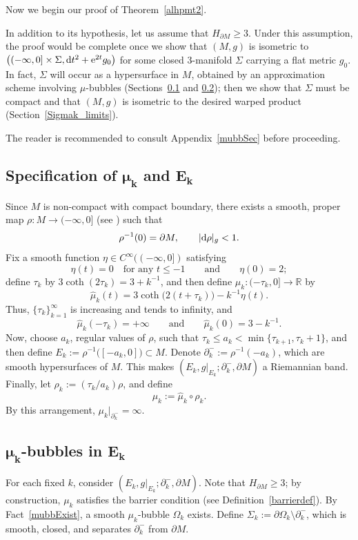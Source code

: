 \documentclass[10pt,a4paper]{amsart}
\numberwithin{equation}{section}
\def\ed{{\rm d}}
\begin{document}
Now we begin our proof of Theorem~\ref{alhpmt2}.

In addition to its hypothesis, let us assume that $H_{\partial M} \ge 3$.
Under this assumption, the proof would be complete once we show that
$(M,g)$ is isometric to $\bigl((-\infty,0]\times \Sigma, \ed t^2 + {\rm e}^{2t} g_0\bigr)$ for some
closed $3$-manifold $\Sigma$ carrying a flat metric $g_0$. In fact,
 $\Sigma$ will occur as a hypersurface in $M$, obtained by an approximation scheme involving $\mu$-bubbles (Sections~\ref{tauketc} and \ref{muk_in_Ek}); then we show that $\Sigma$ must be compact and that $(M,g)$ is isometric to the desired warped product (Section~\ref{Sigmak_limits}).

The reader is recommended to consult Appendix~\ref{mubbSec} before proceeding.

\subsection[Specification of mu\_{}k and E\_{}k]{Specification of $\boldsymbol{\mu_k}$ and $\boldsymbol{E_k}$}\label{tauketc}

Since $M$ is non-compact with compact boundary, there exists a smooth, proper map $\rho\colon M\rightarrow (-\infty,0]$ (see \cite[Lemma 2.1]{Zhu2020}) such that
\[
	\rho^{-1}(0)=\partial M,\qquad |\ed\rho|_g<1.
\]
Fix a smooth function $\eta\in C^\infty((-\infty,0])$ satisfying
\[
	\eta(t)=0 \quad\mbox{for any } t\le -1 \qquad \mbox{and}\qquad \eta (0)=2;
\]
define $\tau_k$ by
$ 3\coth(2\tau_k) = 3+ k^{-1}$,
and then define $\hat\mu_{k}\colon (-\tau_k,0]\rightarrow \mathbb{R}$ by
\[
	\hat\mu_{k}(t)=3\coth\bigl(2(t+\tau_k)\bigr)-k^{-1}\eta(t).
\]
Thus, $\{\tau_k\}_{k = 1}^\infty$ is increasing and tends to infinity, and
\[
	\hat\mu_{k}(-\tau_k)=+\infty\qquad\mbox{and}\qquad \hat\mu_{k}(0)=3-k^{-1}.
\]
Now, choose $a_k$, regular values of
$\rho$, such that $\tau_k\le a_k < \min\{\tau_{k+1}, \tau_k + 1\}$, and then define $E_{k}:=\rho^{-1}\bigl([-a_{k},0]\bigr)\subset M$.
Denote $\partial_{k}^- :=\rho^{-1}(-a_{k})$,
which are smooth hypersurfaces of $M$. This makes $(E_k, g|_{E_k}; \partial_k^-,\partial M)$
a Riemannian band.
Finally, let $\rho_{k}:=(\tau_k/a_k)\rho$, and define
 \[
 	\mu_k := \hat\mu_k\circ\rho_k.
\] By this arrangement, $\mu_k|_{\partial_k^-} = \infty$.

\subsection[mu\_{}k-bubbles in E\_{}k]{$\boldsymbol{\mu_k}$-bubbles in $\boldsymbol{E_k}$}
\label{muk_in_Ek}
For each fixed $k$, consider $(E_k, g|_{E_k}; \partial_k^-, \partial M)$.
Note that $H_{\partial M}\ge 3$; by construction, $\mu_k$ satisfies
the barrier condition (see Definition~\ref{barrierdef}).
By Fact~\ref{mubbExist}, a smooth $\mu_k$-bubble $\Omega_k$ exists.
Define $\Sigma_k := \partial\Omega_k \setminus \partial_k^-$, which is smooth, closed, and separates $\partial_k^-$ from $\partial M$.
\end{document}

